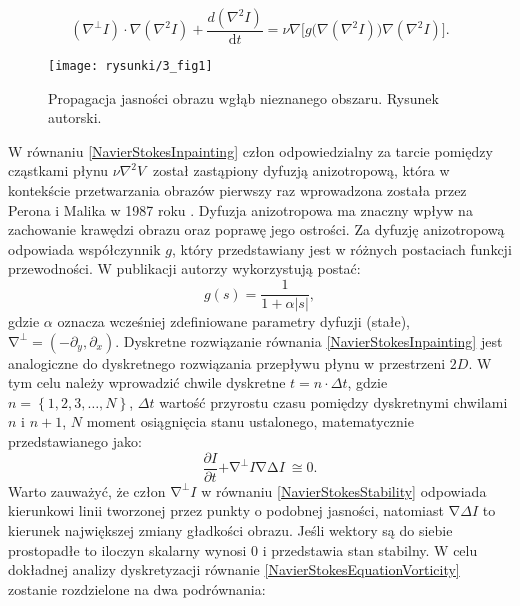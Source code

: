 \documentclass[a4paper,12pt,twoside,openany]{report}
\begin{document}
\begin{equation}
\left( \nabla ^ \bot I \right) \cdot \nabla \left(\nabla^{2} I \right) +\frac{d\left( \nabla ^{2}I\right)}{\mathrm{d}t} = \nu \nabla \Big[ g \Big( \nabla \left(\nabla ^2 I \right) \Big) \nabla \left( \nabla^2 I \right) \Big]
\label{NavierStokesInpainting}
.
\end{equation}
\begin{figure}[!h]
	\centering
	\texttt{[image: rysunki/3\_fig1]}
	\caption{Propagacja jasności obrazu wgłąb nieznanego obszaru. Rysunek autorski.}
	\label{3_fig1}
\end{figure}
W równaniu \eqref{NavierStokesInpainting} człon odpowiedzialny za tarcie pomiędzy cząstkami płynu $\nu {\nabla }^2V\ $ został zastąpiony dyfuzją anizotropową, która w kontekście przetwarzania obrazów pierwszy raz wprowadzona została przez Perona i Malika w 1987 roku \cite{perona1990scale}.
Dyfuzja anizotropowa ma znaczny wpływ na zachowanie krawędzi obrazu oraz poprawę jego ostrości. Za dyfuzję anizotropową odpowiada współczynnik $g$, który przedstawiany jest w różnych postaciach funkcji przewodności. W publikacji \cite{au2001image} autorzy wykorzystują postać:
\begin{equation}
g\left(s\right)=\frac{1}{1+\alpha \left|s\right|}
,
\end{equation}
gdzie $\alpha$ oznacza wcześniej zdefiniowane parametry dyfuzji (stałe), ${\mathrm{\nabla }}^{\bot }=({-\partial }_y,{\partial }_x)$. 
Dyskretne rozwiązanie równania \eqref{NavierStokesInpainting} jest analogiczne do dyskretnego rozwiązania przepływu płynu w przestrzeni $2D$. W tym celu należy wprowadzić chwile dyskretne $t=n\cdot \Delta t$, gdzie $n=\left\{1,2,3,\dots ,N\right\}$, $\Delta t$ wartość przyrostu czasu pomiędzy dyskretnymi chwilami $n$ i $n+1$, $N$ moment osiągnięcia stanu ustalonego, matematycznie przedstawianego jako:
\begin{equation}
\frac{\partial I}{\partial t}\mathrm{+}{\mathrm{\nabla }}^{\mathrm{\bot }}I\mathrm{\nabla }\mathrm{\Delta }I\mathrm{\ }\mathrm{\cong }\mathrm{0}
\label{NavierStokesStability}
.
\end{equation}
Warto zauważyć, że człon ${\mathrm{\nabla }}^{\bot }I$ w równaniu \eqref{NavierStokesStability} odpowiada kierunkowi linii tworzonej przez punkty o podobnej jasności, natomiast $\mathrm{\nabla }\Delta I$ to kierunek największej zmiany gładkości obrazu. Jeśli wektory są do siebie prostopadłe to iloczyn skalarny wynosi 0 i przedstawia stan stabilny. 
W celu dokładnej analizy dyskretyzacji równanie \eqref{NavierStokesEquationVorticity} zostanie rozdzielone na dwa podrównania:
\end{document}

